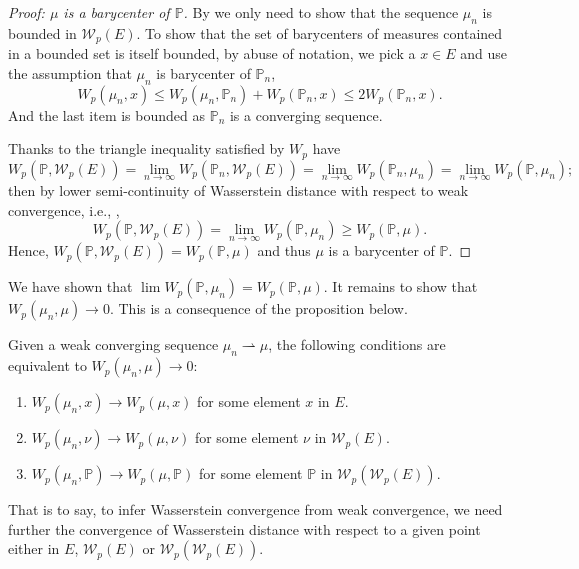 \begin{proof}[Proof: $\mu$ is a barycenter of $\mathbb{P}$]
	By  we only need
	to show that the sequence $\mu_n$ is bounded in $\mathcal{W}_p(E)$.
	To show that the set of barycenters of measures contained in
	a bounded set is itself bounded, by abuse of notation,
	we pick a $x \in E$ and use the assumption that $\mu_n$ is barycenter of $\mathbb{P}_n$,
	\[
		W_p(\mu_n, x) \leq W_p(\mu_n, \mathbb{P}_n)  + W_p(\mathbb{P}_n, x) \leq 2 W_p(\mathbb{P}_n , x).
	\]
	And the last item is bounded as $\mathbb{P}_n$ is a converging sequence.

	Thanks to the triangle inequality satisfied by $W_p$ have
	\[
		W_p(\mathbb{P}, \mathcal{W}_p(E)) =
		\lim_{n \rightarrow \infty}W_p(\mathbb{P}_n, \mathcal{W}_p(E))=\lim_{n \rightarrow \infty}W_p(\mathbb{P}_n, \mu_n)
		= \lim_{n \rightarrow \infty}W_p(\mathbb{P}, \mu_n);
	\]
	then by lower semi-continuity of Wasserstein distance
	with respect to weak convergence, i.e., ,
	\[
		W_p(\mathbb{P}, \mathcal{W}_p(E)) =
		\lim_{n \rightarrow \infty}W_p(\mathbb{P}, \mu_n)
		\geq W_p(\mathbb{P}, \mu).
	\]
	Hence, $W_p(\mathbb{P}, \mathcal{W}_p(E)) =W_p(\mathbb{P}, \mu)$ and thus $\mu$ is a barycenter of $\mathbb{P}$.
\end{proof}

We have shown that $ \lim W_p(\mathbb{P}, \mu_n) = W_p(\mathbb{P}, \mu)$.
It remains to show that $ W_p(\mu_n, \mu) \rightarrow 0$.
This is a consequence of the proposition below.

\begin{prop}
	Given a weak converging sequence $\mu_n \rightharpoonup \mu$,
	the following conditions are equivalent to $W_p(\mu_n, \mu) \rightarrow 0$:
	\begin{enumerate}
		\item $W_p(\mu_n, x) \rightarrow W_p(\mu, x)$ for some element $x$ in $E$.
		\item $W_p(\mu_n, \nu) \rightarrow W_p(\mu, \nu)$ for some element $\nu$ in $\mathcal{W}_p(E)$.
		\item $W_p(\mu_n, \mathbb{P}) \rightarrow W_p(\mu, \mathbb{P})$ for some element $\mathbb{P}$ in $\mathcal{W}_p(\mathcal{W}_p(E))$.
	\end{enumerate}
\end{prop}

That is to say,
to infer Wasserstein convergence from weak convergence,
we need further the convergence of Wasserstein distance with respect to a given point
either in $E$, $\mathcal{W}_p(E)$ or $\mathcal{W}_p(\mathcal{W}_p(E))$.

